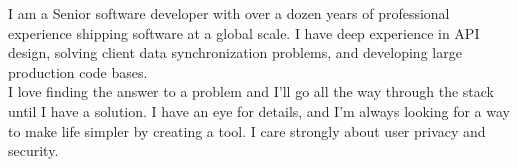

\begin{cvparagraph}

I am a Senior software developer with over a dozen years of professional experience shipping software at a global scale. 
I have deep experience in API design, solving client data synchronization problems, and developing large production code bases. \\
I love finding the answer to a problem and I'll go all the way through the stack until I have a solution.
I have an eye for details, and I'm always looking for a way to make life simpler by creating a tool. 
I care strongly about user privacy and security.
\end{cvparagraph}

